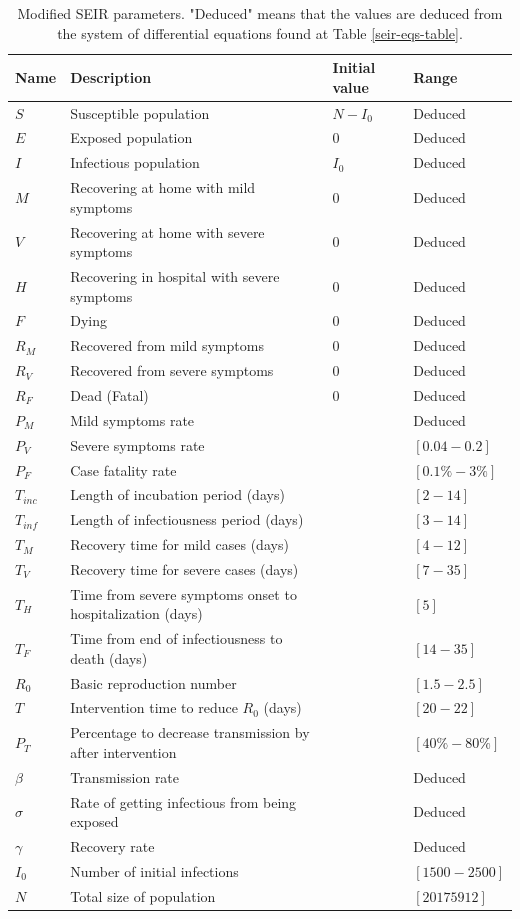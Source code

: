 \documentclass[11pt]{article}
\begin{document}
\begin{table}[H]
  \caption{Modified SEIR parameters. "Deduced" means that the values are deduced from the system of differential equations found at Table \ref{seir-eqs-table}.}
  \label{seir-params-table}
  \centering
  \begin{tabular}{llll}
    \toprule
    Name & Description & Initial value & Range \\
    \midrule
    $S$ & Susceptible population & $N - I_0$ & Deduced \\
    $E$ & Exposed population & $0$ & Deduced \\
    $I$ & Infectious population & $I_0$ & Deduced \\
    $M$ & Recovering at home with mild symptoms & 0 & Deduced \\
    $V$ & Recovering at home with severe symptoms & 0 & Deduced \\
    $H$ & Recovering in hospital with severe symptoms & 0 & Deduced \\
    $F$ & Dying & 0 & Deduced \\
    $R_M$ & Recovered from mild symptoms & 0 & Deduced \\
    $R_V$ & Recovered from severe symptoms & 0 & Deduced \\
    $R_F$ & Dead (Fatal) & 0 & Deduced \\
    $P_M$ & Mild symptoms rate & & Deduced \\
    $P_V$ & Severe symptoms rate & & $[0.04 - 0.2]$\\
    $P_F$ & Case fatality rate & & $[0.1\% - 3\%]$\\
    $T_{inc}$ & Length of incubation period (days) & & $[2-14]$\\
    $T_{inf}$ & Length of infectiousness period (days)  & & $[3-14]$\\
    $T_M$ & Recovery time for mild cases (days) & & $[4-12]$\\
    $T_V$ & Recovery time for severe cases (days) & & $[7-35]$\\
    $T_H$ & Time from severe symptoms onset to hospitalization (days) & & $[5]$\\
    $T_F$ & Time from end of infectiousness to death (days) & & $[14-35]$\\
    $R_0$ & Basic reproduction number & & $[1.5-2.5]$\\
    $T$ & Intervention time to reduce $R_0$ (days) & & $[20-22]$\\
    $P_T$ & Percentage to decrease transmission by after intervention & & $[40\% - 80\%]$\\
    $\beta$ & Transmission rate & & Deduced \\
    $\sigma$ & Rate of getting infectious from being exposed & & Deduced \\
    $\gamma$ & Recovery rate & & Deduced \\
    $I_0$ & Number of initial infections & & $[1500-2500]$ \\
    $N$ & Total size of population & & $[20175912]$\\
    \bottomrule
  \end{tabular}
\end{table}
\end{document}
